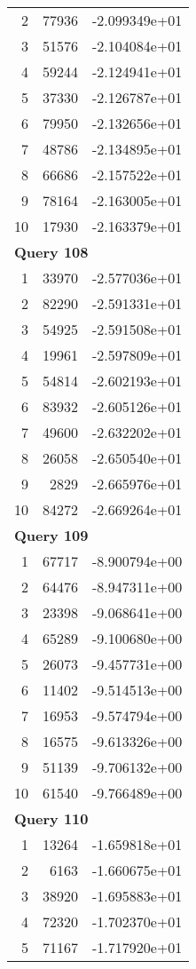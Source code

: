 \begin{longtable}[{p}]{@{}rrp{}@{}}
2 & 77936 & -2.099349e+01 \\
3 & 51576 & -2.104084e+01 \\
4 & 59244 & -2.124941e+01 \\
5 & 37330 & -2.126787e+01 \\
6 & 79950 & -2.132656e+01 \\
7 & 48786 & -2.134895e+01 \\
8 & 66686 & -2.157522e+01 \\
9 & 78164 & -2.163005e+01 \\
10 & 17930 & -2.163379e+01 \\
\midrule
\multicolumn{3}{l}{\bfseries Query 108} \\
1 & 33970 & -2.577036e+01 \\
2 & 82290 & -2.591331e+01 \\
3 & 54925 & -2.591508e+01 \\
4 & 19961 & -2.597809e+01 \\
5 & 54814 & -2.602193e+01 \\
6 & 83932 & -2.605126e+01 \\
7 & 49600 & -2.632202e+01 \\
8 & 26058 & -2.650540e+01 \\
9 & 2829 & -2.665976e+01 \\
10 & 84272 & -2.669264e+01 \\
\midrule
\multicolumn{3}{l}{\bfseries Query 109} \\
1 & 67717 & -8.900794e+00 \\
2 & 64476 & -8.947311e+00 \\
3 & 23398 & -9.068641e+00 \\
4 & 65289 & -9.100680e+00 \\
5 & 26073 & -9.457731e+00 \\
6 & 11402 & -9.514513e+00 \\
7 & 16953 & -9.574794e+00 \\
8 & 16575 & -9.613326e+00 \\
9 & 51139 & -9.706132e+00 \\
10 & 61540 & -9.766489e+00 \\
\midrule
\multicolumn{3}{l}{\bfseries Query 110} \\
1 & 13264 & -1.659818e+01 \\
2 & 6163 & -1.660675e+01 \\
3 & 38920 & -1.695883e+01 \\
4 & 72320 & -1.702370e+01 \\
5 & 71167 & -1.717920e+01 \\

\end{longtable}
